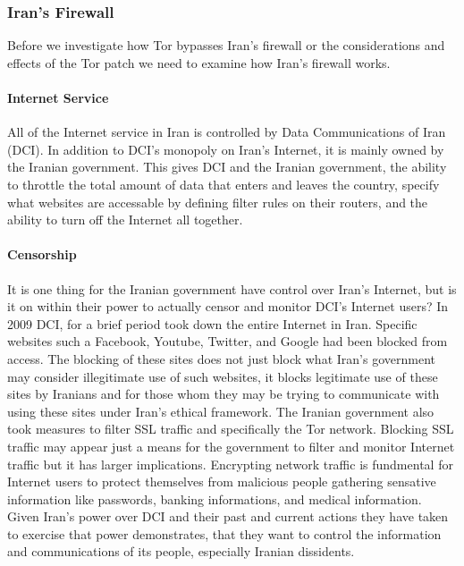 \documentclass[11pt]{article}
\begin{document}
\begin{multicols}{2}
\subsubsection{Iran's Firewall}
Before we investigate how Tor bypasses Iran's firewall or the considerations and
effects of the Tor patch we need to examine how Iran's firewall works.

\paragraph{Internet Service}

All of the Internet service in Iran is controlled by Data Communications of Iran
(DCI).\cite{FindingWayAroundIranianCensorship} In addition to DCI's monopoly on
Iran's Internet, it is mainly owned by the Iranian government.\cite{
FindingWayAroundIranianCensorship, DCI:Articles} This gives DCI and the
Iranian government, the ability to throttle the total amount of data that enters
and leaves the country, specify what websites are accessable by defining filter
rules on their routers, and the ability to turn off the Internet all together.
\cite{FindingWayAroundIranianCensorship}

\paragraph{Censorship} 

It is one thing for the Iranian government have control over Iran's
Internet, but is it on within their power to actually censor and monitor DCI's
Internet users? In 2009 DCI, for a brief period took down the entire Internet in 
Iran.\cite{FindingWayAroundIranianCensorship} Specific websites such a
Facebook, Youtube, Twitter, and Google had been blocked from access.\cite{
FindingWayAroundIranianCensorship, IransElectronicCurtain} The blocking of
these sites does not just block what Iran's government may consider illegitimate
use of such websites, it  blocks legitimate use of these sites by Iranians and
for those whom they may be trying to communicate with using these sites under
Iran's ethical framework. The Iranian government also took measures to filter
SSL traffic and specifically the Tor network.\cite{Tor:IranPartiallyBlocksSSL,
IranBlocksTorSameDayFix} Blocking SSL traffic may appear just a means for the
government to filter and monitor Internet traffic but it has larger
implications. Encrypting network traffic is fundmental for Internet users to
protect themselves from malicious people gathering sensative information like
passwords, banking informations, and medical information. Given Iran's power
over DCI and their past and current actions they have taken to exercise that
power demonstrates, that they want to control the information and communications
of its people, especially Iranian dissidents.



\end{multicols}
\end{document}
